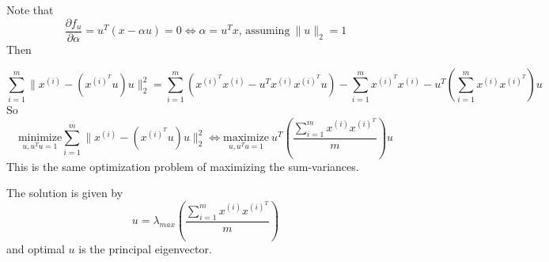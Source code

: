 \begin{answer}
	Note that
\[ \frac{\partial f_u}{\partial \alpha}  = u^T(x - \alpha u) = 0 \Leftrightarrow \alpha = u^Tx,\, \text{assuming}\  \|u\|_{2} = 1\]
Then

\[ \sum_{i = 1}^{m} \|x^{(i)} - (x^{(i)^T} u)u\|^2_{2} = \sum_{i =1}^{m}\left( x^{(i)^T}x^{(i)} - u^Tx^{(i)}x^{(i)^T}u\right) - \sum_{i =1}^{m}x^{(i)^T}x^{(i)} - u^T\left(\sum_{i =1}^{m} x^{(i)}x^{(i)^T}\right)u\]
So
$$ \underset{u,u^Tu=1}{\text{minimize}}\sum_{i = 1}^{m} \|x^{(i)} - (x^{(i)^T} u)u\|^2_{2} \Leftrightarrow \underset{u,u^Tu=1}{\text{maximize}} \ u^T\left(\frac{\sum_{i =1}^{m} x^{(i)}x^{(i)^T}}{m}\right)u $$
This is the same optimization problem of maximizing the sum-variances.

The solution is given by \[ u = \lambda_{max} \left(\frac{\sum_{i =1}^{m} x^{(i)}x^{(i)^T}}{m}\right)\]
and optimal $ u $ is the principal eigenvector.
\end{answer}
